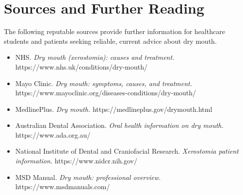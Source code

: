 \section*{Sources and Further Reading}
The following reputable sources provide further information for healthcare students and patients seeking reliable, current advice about dry mouth.
\begin{itemize}
    \item NHS. \textit{Dry mouth (xerostomia): causes and treatment.} https://www.nhs.uk/conditions/dry-mouth/
    \item Mayo Clinic. \textit{Dry mouth: symptoms, causes, and treatment.} https://www.mayoclinic.org/diseases-conditions/dry-mouth/
    \item MedlinePlus. \textit{Dry mouth.} https://medlineplus.gov/drymouth.html
    \item Australian Dental Association. \textit{Oral health information on dry mouth.} https://www.ada.org.au/
    \item National Institute of Dental and Craniofacial Research. \textit{Xerostomia patient information.} https://www.nidcr.nih.gov/
    \item MSD Manual. \textit{Dry mouth: professional overview.} https://www.msdmanuals.com/
\end{itemize}
